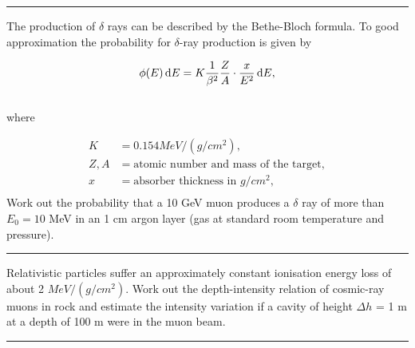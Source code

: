 \noindent\rule{7in}{1.5pt}


\begin{problem}{1.7}
The production of $\delta$ rays can be described by the Bethe-Bloch formula. To good approximation the probability for $\delta$-ray production is given by

\begin{align*}
    \phi(E) \mathop{}\!\mathrm{d} E = K \frac{1}{\beta^2} \frac{Z}{A} \cdot \frac{x}{E^2} \mathop{}\!\mathrm{d} E,
\end{align*}\\
where

\begin{align*}
    K &= 0.154 \unit{MeV}/(\unit{g/cm^2}),\\
    Z,A &= \text{atomic number and mass of the target},\\
    x &= \text{absorber thickness in } \unit{g/cm^2},\\
\end{align*}
Work out the probability that a 10 GeV muon produces a $\delta$ ray of more than $E_0 = 10$ MeV in an 1 cm argon layer (gas at standard room temperature and pressure).
\end{problem}
\begin{solution}

\end{solution}

\noindent\rule{7in}{1.5pt}


\begin{problem}{1.8}
Relativistic particles suffer an approximately constant ionisation energy loss of about 2 $\unit{MeV}/(\unit{g/cm^2})$. Work out the depth-intensity relation of cosmic-ray muons in rock and estimate the intensity variation if a cavity of height $\Delta h$ = 1 m at a depth of 100 m were in the muon beam.
\end{problem}
\begin{solution}

\end{solution}

\noindent\rule{7in}{1.5pt}

